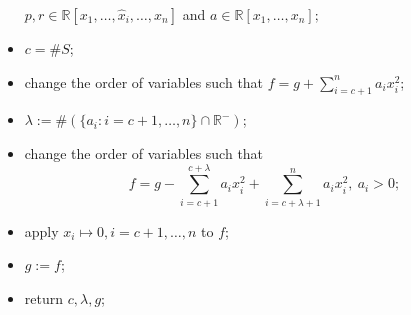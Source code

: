 \documentclass{amsproc}
\begin{document}
\begin{itemize}
$p,r\in\mathbb R[x_1,\ldots,\hat x_i,\ldots,x_n]$\newline
\phantom{}\quad\quad\quad\quad\quad and $a\in\mathbb
R[x_1,\ldots,x_n];$\newline
\item $c =\# S$;
\item change the order of variables such that $\displaystyle
f=g+\sum_{i=c+1}^na_ix_i^2$;
\item $\lambda:=\#(\{a_i:i=c+1,\ldots,n\}\cap\mathbb R^-)$;
\item change the order of variables such that
\[f=g-\sum_{i=c+1}^{c+\lambda}a_ix_i^2+\sum_{i=c+\lambda+1}^na_ix_i^2,\
a_i>0;\]
\item apply $x_i\mapsto 0, i=c+1,\ldots,n$ to $f$;
\item $g:=f$;
\item return $c, \lambda, g$;
\end{itemize}
\end{document}
